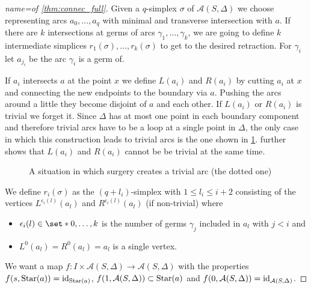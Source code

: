 \begin{proof}[{name={of \autoref{thm:connec_full}}}]
	Given a $q$-simplex $\sigma$ of $\mathcal{A}(S,\Delta)$ we choose representing arcs $a_0, \ldots ,a_q$ with minimal and transverse intersection with $a$.
	If there are $k$ intersections at germs of arcs $\gamma_1, \ldots ,\gamma_k$, we are going to define $k$ intermediate simplices $r_1(\sigma), \ldots ,r_k(\sigma)$ to get to the desired retraction.
	For $\gamma_i$ let $a_{j_i}$ be the arc $\gamma_i$ is a germ of.

	If $a_i$ intersects $a$ at the point $x$ we define $L(a_i)$ and $R(a_i)$ by cutting $a_i$ at $x$ and connecting the new endpoints to the boundary via $a$.
	Pushing the arcs around a little they become disjoint of $a$ and each other.
	If $L(a_i)$ or $R(a_i)$ is trivial we forget it.
	Since $\Delta$ has at most one point in each boundary component and therefore trivial arcs have to be a loop at a single point in $\Delta$, the only case in which this construction leads to trivial arcs is the one shown in \cref{fig:surg_trivial}.
	 further shows that $L(a_i)$ and $R(a_i)$ cannot be be trivial at the same time.
	\begin{figure}[hbt]
		\centering
		\caption{A situation in which surgery creates a trivial arc (the dotted one)}\label{fig:surg_trivial}
	\end{figure}
	
	We define $r_i(\sigma)$ as the $(q+ l_i)$-simplex with $1 \le l_i \le i + 2$ consisting of the vertices $L^{\epsilon_i(l)}(a_l)$ and $R^{\epsilon_i(l)}(a_l)$ (if non-trivial)  where 
	\begin{itemize}
		\item $\epsilon_i(l) \in \set*{0, \ldots ,k}$ is the number of germs $\gamma_j$ included in $a_l$ with $j < i$ and
		\item $L^0(a_l)=R^0(a_l)=a_l$ is a single vertex.
	\end{itemize}
	We want a map $f \colon I \times \mathcal{A}(S,\Delta) \to \mathcal{A}(S,\Delta)$ with the properties $f(s,\operatorname{Star}(a)) = \operatorname{id}_{\operatorname{Star}(a)}$, $f(1,\mathcal{A}(S,\Delta)) \subset \operatorname{Star}(a)$ and $f(0,\mathcal{A}(S,\Delta)) = \operatorname{id}_{\mathcal{A}(S,\Delta)}$.
	

\end{proof}
